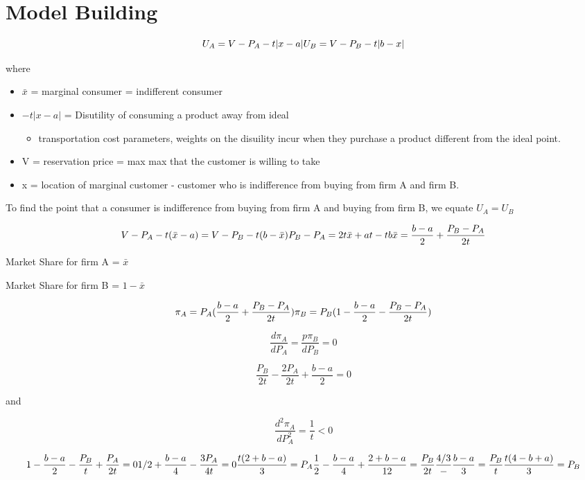 \documentclass[
]{book}
\providecommand{\tightlist}{%
  \setlength{\itemsep}{0pt}\setlength{\parskip}{0pt}}
\begin{document}
\hypertarget{model-building}{%
\chapter{Model Building}\label{model-building}}

\[
U_A = V - P_A - t |x-a| \\
U_B = V - P_B - t|b-x|
\]

where

\begin{itemize}
\item
  \(\bar{x}\) = marginal consumer = indifferent consumer
\item
  \(-t|x-a|\) = Disutility of consuming a product away from ideal

  \begin{itemize}
  \tightlist
  \item
    transportation cost parameters, weights on the disuility incur when they purchase a product different from the ideal point.
  \end{itemize}
\item
  V = reservation price = max max that the customer is willing to take
\item
  x = location of marginal customer - customer who is indifference from buying from firm A and firm B.
\end{itemize}

To find the point that a consumer is indifference from buying from firm A and buying from firm B, we equate \(U_A = U_B\)

\[
V - P_A - t(\bar{x}-a) = V - P_B - t (b-\bar{x}) \\
P_B - P_A = 2t \bar{x}+ at - tb \\
\bar{x} = \frac{b-a}{2} + \frac{P_B - P_A}{2t}
\]

Market Share for firm A = \(\bar{x}\)

Market Share for firm B = \(1 - \bar{x}\)

\[
\pi_A = P_A (\frac{b-a}{2} + \frac{P_B - P_A}{2t}) \\
\pi_B = P_B (1 - \frac{b-a}{2} - \frac{P_B - P_A}{2t})
\]

\[
\frac{d\pi_A}{d P_A} = \frac{p \pi_B}{d P_B} = 0
\]

\[
\frac{P_B}{2t} - \frac{2 P_A}{2t} + \frac{b-a}{2} = 0
\]

and

\[
\frac{d^2\pi_A}{dP^2_A} = \frac{1}{t} < 0
\]

\[
1 - \frac{b-a}{2} - \frac{P_B}{t} + \frac{P_A}{2t} = 0 \\
1/2 + \frac{b-a}{4} - \frac{3 P_A}{4t} = 0 \\
\frac{t(2 + b- a)}{3}= P_A \\
\frac{1}{2} - \frac{b-a}{4} + \frac{2 + b - a}{12} = \frac{P_B}{2t} \\
\frac{4/3} - \frac{b-a}{3} = \frac{P_B}{t} \\
\frac{t(4 - b+a)}{3} = P_B
\]
\end{document}
